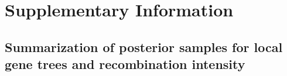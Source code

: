 \documentclass[10pt]{article}
\begin{document}




\clearpage{}
\section*{Supplementary Information}

\subsection*{Summarization of posterior samples for local gene trees and recombination intensity}
\end{document}
